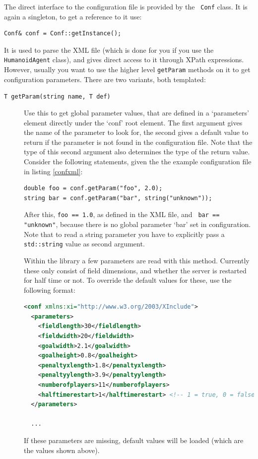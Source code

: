 The direct interface to the configuration file is provided by the {\tt
  Conf} class. It is again a singleton, to get a reference to it use:
\begin{lstlisting}[frame=single]
Conf& conf = Conf::getInstance();
\end{lstlisting}
It is used to parse the XML file (which is done for you
if you use the {\tt HumanoidAgent} class), and gives direct access to
it through XPath expressions. However, usually you want to use the
higher level {\tt getParam} methods on it to get configuration
parameters. There are two variants, both templated:
\begin{description}
\item[\tt T getParam(string name, T def)] Use this to get global parameter
  values, that are defined in a `parameters' element directly under
  the `conf' root element. The first argument gives the name of the
  parameter to look for, the second gives a default value to return if
  the parameter is not found in the configuration file. Note that the
  type of this second argument also determines the type of the return
  value. Consider the following statements, given the the example
  configuration file in listing \ref{confxml}:
\begin{lstlisting}[frame=single]
double foo = conf.getParam("foo", 2.0);
string bar = conf.getParam("bar", string("unknown"));
\end{lstlisting}
  After this, {\tt foo == 1.0}, as defined in the XML file, and {\tt
    bar == "unknown"}, because there is no global parameter `bar' set
  in configuration. Note that to read a string parameter you have to
  explicitly pass a {\tt std::string} value as second argument.

  Within the library a few parameters are read with this
  method. Currently these only consist of field dimensions, and
  whether the server is restarted for half time or not. To override
  the default values for these, use the following format:
\begin{lstlisting}[frame=single,language=xml]
<conf xmlns:xi="http://www.w3.org/2003/XInclude">
  <parameters>
    <fieldlength>30</fieldlength>
    <fieldwidth>20</fieldwidth>
    <goalwidth>2.1</goalwidth>
    <goalheight>0.8</goalheight>
    <penaltyxlength>1.8</penaltyxlength>
    <penaltyylength>3.9</penaltyylength>
    <numberofplayers>11</numberofplayers>
    <halftimerestart>1</halftimerestart> <!-- 1 = true, 0 = false -->
  </parameters>
  
  ...
\end{lstlisting}
  If these parameters are missing, default values will be loaded
  (which are the values shown above).


\end{description}
